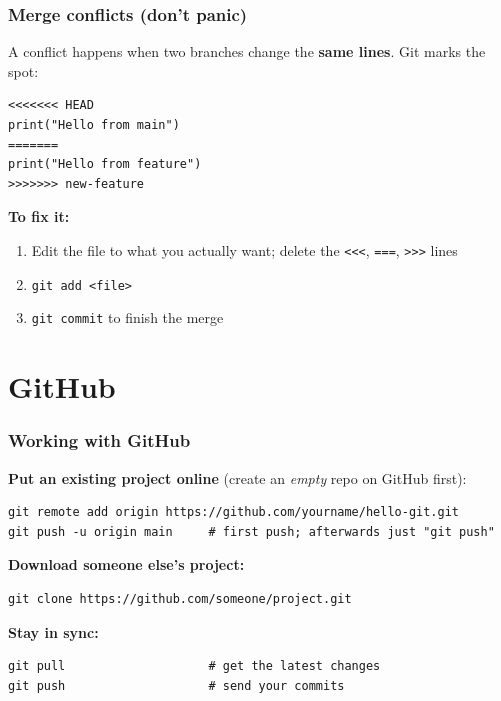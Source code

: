 \documentclass[aspectratio=169,10pt,compress]{beamer}
\newcommand{\cmd}[1]{\texttt{\color{gitred}#1}}
\begin{document}
\begin{frame}[t,fragile] \frametitle{Merge conflicts (don't panic)}
  A conflict happens when two branches change the \textbf{same lines}.
  Git marks the spot:

\begin{lstlisting}[language={}]
<<<<<<< HEAD
print("Hello from main")
=======
print("Hello from feature")
>>>>>>> new-feature
\end{lstlisting}

  \textbf{To fix it:}
  \begin{enumerate}
    \item Edit the file to what you actually want; delete the
          \texttt{<{}<{}<}, \texttt{===}, \texttt{>{}>{}>} lines
    \item \cmd{git add <file>}
    \item \cmd{git commit} to finish the merge
  \end{enumerate}
\end{frame}

\section[GitHub]{GitHub}

\begin{frame}[t,fragile] \frametitle{Working with GitHub}
  \textbf{Put an existing project online} (create an \emph{empty} repo on GitHub first):
\begin{lstlisting}
git remote add origin https://github.com/yourname/hello-git.git
git push -u origin main     # first push; afterwards just "git push"
\end{lstlisting}

  \textbf{Download someone else's project:}
\begin{lstlisting}
git clone https://github.com/someone/project.git
\end{lstlisting}

  \textbf{Stay in sync:}
\begin{lstlisting}
git pull                    # get the latest changes
git push                    # send your commits
\end{lstlisting}
\end{frame}
\end{document}
